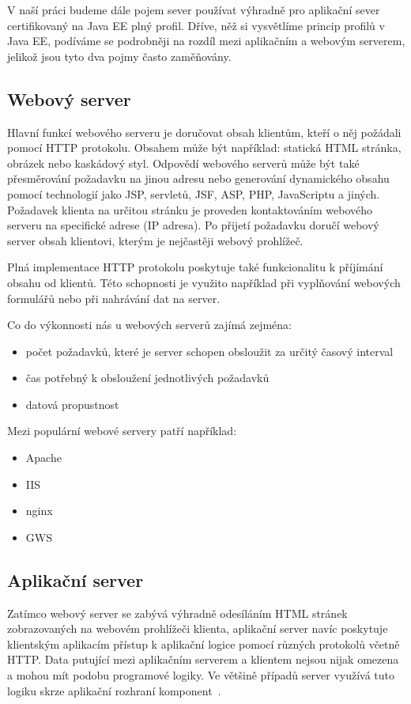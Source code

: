 \documentclass[122pt,oneside]{fithesis}
\begin{document}
V naší práci budeme dále pojem sever používat výhradně pro aplikační sever certifikovaný na Java EE plný profil. Dříve, něž si vysvětlíme princip profilů v Java EE, podíváme se podrobněji na rozdíl mezi aplikačním a webovým serverem, jelikož jsou tyto dva pojmy často zaměňovány.

\subsection{Webový server}
Hlavní funkcí webového serveru je doručovat obsah klientům, kteří o něj požádali pomocí HTTP protokolu. Obsahem může být například: statická HTML stránka, obrázek nebo kaskádový styl. Odpovědí webového serverů může být také přesměrování požadavku na jinou adresu nebo generování dynamického obsahu pomocí technologií jako JSP, servletů, JSF, ASP, PHP, JavaScriptu a jiných. Požadavek klienta na určitou stránku je proveden kontaktováním webového serveru na specifické adrese (IP adresa). Po přijetí požadavku doručí webový server obsah klientovi, kterým je nejčastěji webový prohlížeč.

Plná implementace HTTP protokolu poskytuje také funkcionalitu k příjímání obsahu od klientů. Této schopnosti je využito například při vyplňování webových formulářů nebo při nahrávání dat na server.

Co do výkonnosti nás u webových serverů zajímá zejména:
\begin{itemize}
  \item počet požadavků, které je server schopen obsloužit za určitý časový interval
  \item čas potřebný k obsloužení jednotlivých požadavků
  \item datová propustnost
\end{itemize}
Mezi populární webové servery patří například:
\begin{itemize}
  \item Apache
  \item IIS
  \item nginx
  \item GWS
\end{itemize}

\subsection{Aplikační server}
Zatímco webový server se zabývá výhradně odesíláním HTML stránek zobrazovaných na webovém prohlížeči klienta, aplikační server navíc poskytuje klientským aplikacím přístup k aplikační logice pomocí různých protokolů včetně HTTP. Data putující mezi aplikačním serverem a klientem nejsou nijak omezena a mohou mít podobu programové logiky. Ve většině případů server využívá tuto logiku skrze aplikační rozhraní komponent~\cite{sintes02}.
\end{document}
